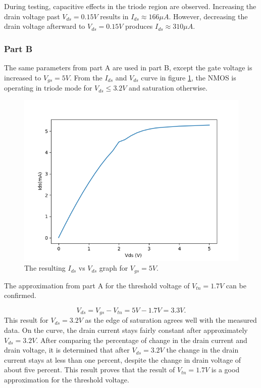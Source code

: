 		\FloatBarrier
		During testing, capacitive effects in the triode region are observed. 
		Increasing the drain voltage past $V_{ds}=0.15V$ results in $I_{ds}\approx 166 \mu A$.
		However, decreasing the drain voltage afterward to $V_{ds}=0.15 V$ produces $I_{ds}\approx 310 \mu A$.

		\subsubsection{Part B}
		The same parameters from part A are used in part B, except the gate voltage is increased to $V_{gs} = 5V$. 
		From the $I_{ds}$ and $V_{ds}$ curve in figure \ref{fig:nmos_5v}, the NMOS is operating in triode mode for $V_{ds} \le 3.2V$ and saturation otherwise.

		\FloatBarrier

		\begin{figure}[h!]
		\centering
		\includegraphics[scale=0.75]{./data/nmos_5v.png}
		\caption{The resulting $I_{ds}$ vs $V_{ds}$ graph for $V_{gs}=5V$.}
		\label{fig:nmos_5v}
		\end{figure}

		\FloatBarrier
		The approximation from part A for the threshold voltage of $V_{tn} = 1.7 V$ can be confirmed.
		
\begin{equation}
	\label{eq:thresh_5V}
		V_{ds} = V_{gs} - V_{tn} = 5 V - 1.7 V = 3.3 V.	
\end{equation}
This result for $V_{ds} = 3.2 V$ as the edge of saturation agrees well with the measured data. 
On the curve, the drain current stays fairly constant after approximately $V_{ds}=3.2 V$.
After comparing the percentage of change in the drain current and drain voltage, it is determined that after $V_{ds} = 3.2 V$ the change in the drain current stays at less than one percent, despite the change in drain voltage of about five percent. 
This result proves that the result of $V_{tn} = 1.7 V$ is a good approximation for the threshold voltage.
